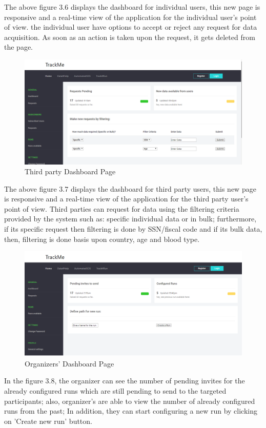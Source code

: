 \documentclass[a4paper, hidelinks, 12pt]{report}
\begin{document}
The above figure 3.6 displays the dashboard for individual users, this new page is responsive and a real-time view of the application for the individual user's point of view. the individual user have options to accept or reject any request for data acquisition. As soon as an action is taken upon the request, it gets deleted from the page.

	\begin{figure}[H]
		\centering
		\includegraphics[scale=0.35]{UI/db_thirdparty.png}
		\caption[UI: Third party Dashboard Page]{Third party Dashboard Page}
		\label{fig:Dashboard for individuals}
	\end{figure}
	The above figure 3.7 displays the dashboard for third party users, this new page is responsive and a real-time view of the application for the third party user's point of view. Third parties can  request for  data using the filtering criteria provided by the system such as: specific individual data or in bulk; furthermore, if its specific request then filtering is done by SSN/fiscal code and if its bulk data, then, filtering is done basis upon country, age and blood type.
	
	
	\begin{figure}[H]
		\centering
		\includegraphics[scale=0.35]{UI/db_organizer1.png}
		\caption[UI: Organizers' Dashboard Page]{Organizers' Dashboard Page}
		\label{fig:Dashboard for Organizer}
	\end{figure}
	In the figure 3.8, the organizer can see the number of pending invites for the already configured runs which are still pending to send to the targeted participants; also, organizer's are able to view the number of already configured runs from the past; In addition, they can start configuring a new run by clicking on 'Create new run' button.
	
\end{document}
